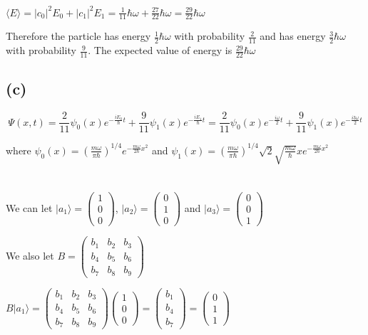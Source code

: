\documentclass[12pt]{article}
\begin{document}
\begin{spacing}{2.0}
$\langle E \rangle= |c_0|^2 E_0+ |c_1|^2 E_1 = \frac{1}{11}\hbar\omega + \frac{27}{22}\hbar\omega = \frac{29}{22}\hbar\omega$

Therefore the particle has energy $\frac{1}{2}\hbar\omega$ with probability $\frac{2}{11}$ and has energy $\frac{3}{2}\hbar\omega$ with probability $\frac{9}{11}$. The expected value of energy is $\frac{29}{22}\hbar\omega$

\subsection*{(c)}

$$\Psi(x,t)= \frac{2}{11}\psi_0(x)e^{-\frac{iE_0}{\hbar}t} + \frac{9}{11}\psi_1(x)e^{-\frac{iE_1}{\hbar}t}= \frac{2}{11}\psi_0(x)e^{-\frac{i\omega}{2}t} + \frac{9}{11}\psi_1(x)e^{-\frac{i3\omega}{2}t}$$

where $\psi_0(x)=\left(\frac{m\omega}{\pi \hbar} \right)^{1/4} e^{-\frac{m\omega}{2\hbar} x^2}$ and $\psi_1(x)= \left(\frac{m\omega}{\pi \hbar} \right)^{1/4} \sqrt{2} \sqrt{\frac{m\omega}{\hbar}} x e^{-\frac{m\omega}{2\hbar} x^2}$

\section{} %
We can let $|a_1\rangle=\left(
\begin{array}{c}
1\\
0\\
0
\end{array}
\right)$, $|a_2\rangle=\left(
\begin{array}{c}
0\\
1\\
0
\end{array}
\right)$ and $|a_3\rangle=\left(
\begin{array}{c}
0\\
0\\
1
\end{array}
\right)$

We also let $B=\left(
\begin{array}{ccc}
b_1 & b_2 & b_3\\
b_4 & b_5 & b_6\\
b_7 & b_8 & b_9
\end{array}
\right)$

$B|a_1\rangle= \left(
\begin{array}{ccc}
b_1 & b_2 & b_3\\
b_4 & b_5 & b_6\\
b_7 & b_8 & b_9
\end{array}
\right)\left(
\begin{array}{c}
1\\
0\\
0
\end{array}\right)= \left(
\begin{array}{c}
b_1\\
b_4\\
b_7
\end{array}\right)= \left(
\begin{array}{c}
0\\
1\\
1
\end{array}\right)$


\end{spacing}
\end{document}
